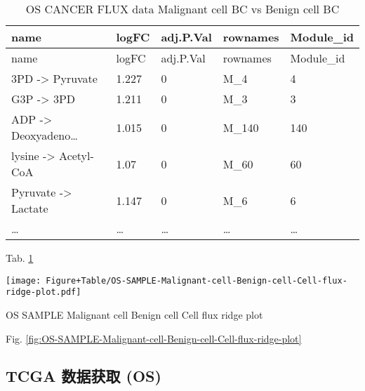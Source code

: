 \documentclass[
]{article}
\begin{document}
\begin{longtable}[]{@{}lllll@{}}
\caption{\label{tab:OS-CANCER-FLUX-data-Malignant-cell-BC-vs-Benign-cell-BC}OS CANCER FLUX data Malignant cell BC vs Benign cell BC}\tabularnewline
\toprule
name & logFC & adj.P.Val & rownames & Module\_id\tabularnewline
\midrule
\endfirsthead
\toprule
name & logFC & adj.P.Val & rownames & Module\_id\tabularnewline
\midrule
\endhead
3PD -\textgreater{} Pyruvate & 1.227 & 0 & M\_4 & 4\tabularnewline
G3P -\textgreater{} 3PD & 1.211 & 0 & M\_3 & 3\tabularnewline
ADP -\textgreater{} Deoxyadeno\ldots{} & 1.015 & 0 & M\_140 & 140\tabularnewline
lysine -\textgreater{} Acetyl-CoA & 1.07 & 0 & M\_60 & 60\tabularnewline
Pyruvate -\textgreater{} Lactate & 1.147 & 0 & M\_6 & 6\tabularnewline
\ldots{} & \ldots{} & \ldots{} & \ldots{} & \ldots{}\tabularnewline
\bottomrule
\end{longtable}

\begin{center}\vspace{1.5cm}\end{center}

Tab. \ref{tab:OS-CANCER-FLUX-data-Malignant-cell-BC-vs-Benign-cell-BC}

\begin{center}\vspace{1.5cm}\end{center}
\def\@captype{figure}
\begin{center}
\texttt{[image: Figure+Table/OS-SAMPLE-Malignant-cell-Benign-cell-Cell-flux-ridge-plot.pdf]}
\caption{OS SAMPLE Malignant cell Benign cell Cell flux ridge plot}\label{fig:OS-SAMPLE-Malignant-cell-Benign-cell-Cell-flux-ridge-plot}
\end{center}

\begin{center}\vspace{1.5cm}\end{center}

Fig. \ref{fig:OS-SAMPLE-Malignant-cell-Benign-cell-Cell-flux-ridge-plot}

\hypertarget{tcga-ux6570ux636eux83b7ux53d6-os}{%
\subsection{TCGA 数据获取 (OS)}\label{tcga-ux6570ux636eux83b7ux53d6-os}}
\end{document}
